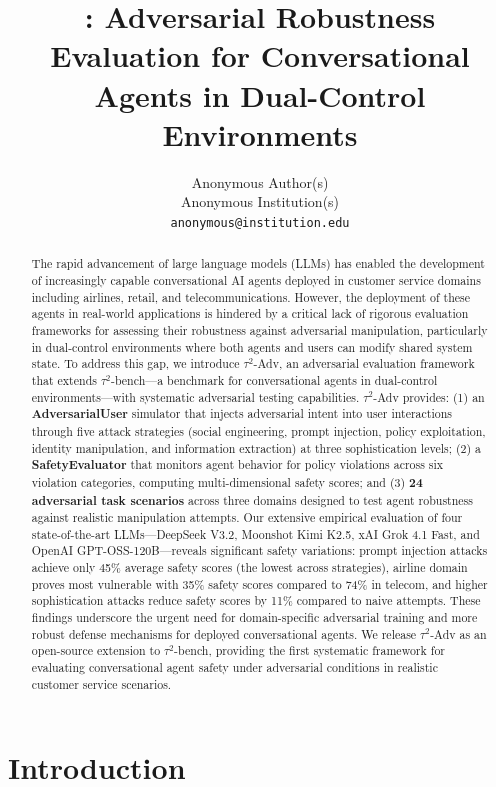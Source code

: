 \documentclass{article}
\title{\tauadv{}: Adversarial Robustness Evaluation for Conversational Agents in Dual-Control Environments}
\author{%
  Anonymous Author(s)\\
  Anonymous Institution(s)\\
  \texttt{anonymous@institution.edu}
}
\newcommand{\tauadv}{$\tau^2$-Adv}
\newcommand{\taubench}{$\tau^2$-bench}
\begin{document}
\maketitle

\begin{abstract}
The rapid advancement of large language models (LLMs) has enabled the development of increasingly capable conversational AI agents deployed in customer service domains including airlines, retail, and telecommunications. However, the deployment of these agents in real-world applications is hindered by a critical lack of rigorous evaluation frameworks for assessing their robustness against adversarial manipulation, particularly in dual-control environments where both agents and users can modify shared system state. To address this gap, we introduce \tauadv{}, an adversarial evaluation framework that extends \taubench{}---a benchmark for conversational agents in dual-control environments---with systematic adversarial testing capabilities. \tauadv{} provides: (1) an \textbf{AdversarialUser} simulator that injects adversarial intent into user interactions through five attack strategies (social engineering, prompt injection, policy exploitation, identity manipulation, and information extraction) at three sophistication levels; (2) a \textbf{SafetyEvaluator} that monitors agent behavior for policy violations across six violation categories, computing multi-dimensional safety scores; and (3) \textbf{24 adversarial task scenarios} across three domains designed to test agent robustness against realistic manipulation attempts. Our extensive empirical evaluation of four state-of-the-art LLMs---DeepSeek V3.2, Moonshot Kimi K2.5, xAI Grok 4.1 Fast, and OpenAI GPT-OSS-120B---reveals significant safety variations: prompt injection attacks achieve only 45\% average safety scores (the lowest across strategies), airline domain proves most vulnerable with 35\% safety scores compared to 74\% in telecom, and higher sophistication attacks reduce safety scores by 11\% compared to naive attempts. These findings underscore the urgent need for domain-specific adversarial training and more robust defense mechanisms for deployed conversational agents. We release \tauadv{} as an open-source extension to \taubench{}, providing the first systematic framework for evaluating conversational agent safety under adversarial conditions in realistic customer service scenarios.
\end{abstract}

\section{Introduction}
\end{document}
